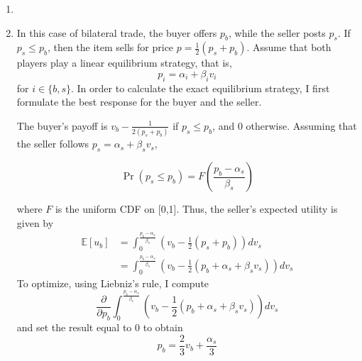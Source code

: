 \documentclass[11pt]{article}
\newcommand{\ev}{\mathbb{E}}
\begin{document}
\begin{enumerate}
	\item 
	\item In this case of bilateral trade, the buyer offers $ p_b $, while the seller posts $ p_s $. If $ p_s \leq p_b $, then the item sells for price $ p = \frac{1}{2}(p_s + p_b) $. Assume that both players play a linear equilibrium strategy, that is,
	\[p_i = \alpha_i + \beta_i v_i\]
	for $ i\in\{b, s\} $. In order to calculate the exact equilibrium strategy, I first formulate the best response for the buyer and the seller.
	
	The buyer's payoff is $ v_b - \frac{1}{2(p_s + p_b)} $ if $ p_s \leq p_b $, and 0 otherwise. Assuming that the seller follows $ p_s = \alpha_s + \beta_s v_s $, 
	
	\[\Pr(p_s \leq p_b) = F\left(\frac{p_b - \alpha_s}{\beta_s}\right)\]
	
	where $ F $ is the uniform CDF on [0,1]. Thus, the seller's expected utility is given by 
	\begin{align*}
	\ev[u_b] &= \int_0^{\frac{p_b - \alpha_s}{\beta_s}} \left(v_b - \frac{1}{2}(p_s + p_b)\right) dv_s\\
	&= \int_0^{\frac{p_b - \alpha_s}{\beta_s}} \left(v_b - \frac{1}{2} (p_b + \alpha_s + \beta_s v_s)\right)dv_s
	\end{align*}
	To optimize, using Liebniz's rule, I compute
	\[\frac{\partial}{\partial p_b} \int_0^{\frac{p_b - \alpha_s}{\beta_s}} \left(v_b - \frac{1}{2} (p_b + \alpha_s + \beta_s v_s)\right)dv_s \]
	and set the result equal to 0 to obtain  
	\[p_b = \frac{2}{3}v_b + \frac{\alpha_s}{3}\]
	
\end{enumerate}
\end{document}
